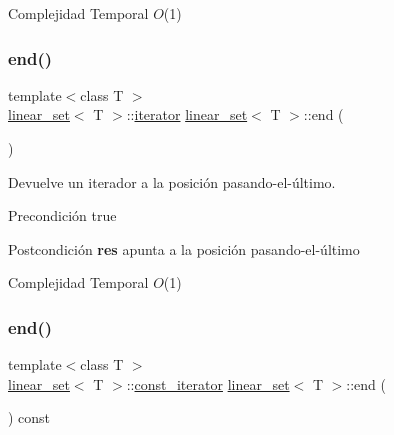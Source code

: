 \begin{DoxyDescription}
\item[Complejidad Temporal]$O$(1)
\end{DoxyDescription}\mbox{\label{classlinear__set_aa16e2607ba7bc80c86eda9f2301d194d}} 
\subsubsection{\texorpdfstring{end()}{end()}\hspace{0.1cm}{\footnotesize\ttfamily [1/2]}}
{\footnotesize\ttfamily template$<$class T $>$ \\
\mbox{\hyperlink{classlinear__set}{linear\+\_\+set}}$<$ T $>$\+::\mbox{\hyperlink{classlinear__set_1_1iterator}{iterator}} \mbox{\hyperlink{classlinear__set}{linear\+\_\+set}}$<$ T $>$\+::end (\begin{DoxyParamCaption}{ }\end{DoxyParamCaption})}



Devuelve un iterador a la posición pasando-\/el-\/último. 

\begin{DoxyPrecond}{Precondición}
true 
\end{DoxyPrecond}
\begin{DoxyPostcond}{Postcondición}
{\bfseries res} apunta a la posición pasando-\/el-\/último
\end{DoxyPostcond}

\begin{DoxyDescription}
\item[Complejidad Temporal]$O$(1)
\end{DoxyDescription}\mbox{\label{classlinear__set_a63decaa5799e90e2f40ee786b44e0263}} 
\subsubsection{\texorpdfstring{end()}{end()}\hspace{0.1cm}{\footnotesize\ttfamily [2/2]}}
{\footnotesize\ttfamily template$<$class T $>$ \\
\mbox{\hyperlink{classlinear__set}{linear\+\_\+set}}$<$ T $>$\+::\mbox{\hyperlink{classlinear__set_1_1const__iterator}{const\+\_\+iterator}} \mbox{\hyperlink{classlinear__set}{linear\+\_\+set}}$<$ T $>$\+::end (\begin{DoxyParamCaption}{ }\end{DoxyParamCaption}) const}



